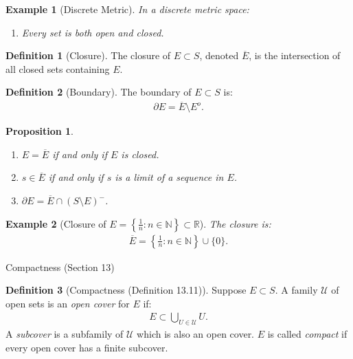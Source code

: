 \documentclass[7pt]{article}
\theoremstyle{definition}
\newtheorem{definition}{Definition}
\theoremstyle{plain}
\newtheorem{proposition}{Proposition}
\newtheorem{example}{Example}
\begin{document}
\begin{example}[Discrete Metric]
In a discrete metric space:
\begin{enumerate}
    \item Every set is both open and closed.
\end{enumerate}
\end{example}

\begin{definition}[Closure]
The closure of $ E \subset S $, denoted $ \overline{E} $, is the intersection of all closed sets containing $ E $.
\end{definition}

\begin{definition}[Boundary]
The boundary of $ E \subset S $ is:
\begin{align}
\partial E = \overline{E} \setminus E^o.
\end{align}
\end{definition}

\begin{proposition}

\begin{enumerate}
    \item $ E = \overline{E} $ if and only if $ E $ is closed.
    \item $ s \in \overline{E} $ if and only if $ s $ is a limit of a sequence in $ E $.
    \item $ \partial E = \overline{E} \cap (S \setminus E)^- $.
\end{enumerate}
\end{proposition}

\begin{example}[Closure of $ E = \left\{\frac{1}{n} : n \in \mathbb{N}\right\} \subset \mathbb{R} $]
The closure is:
\begin{align}
\overline{E} = \left\{\frac{1}{n} : n \in \mathbb{N}\right\} \cup \{0\}.
\end{align}
\end{example}
{Compactness (Section 13)}

\begin{definition}[Compactness (Definition 13.11)]
Suppose $ E \subset S $. A family $ \mathcal{U} $ of open sets is an \emph{open cover} for $ E $ if:
\begin{align}
E \subset \bigcup_{U \in \mathcal{U}} U.
\end{align}
A \emph{subcover} is a subfamily of $ \mathcal{U} $ which is also an open cover. $ E $ is called \emph{compact} if every open cover has a finite subcover.
\end{definition}
\end{document}
